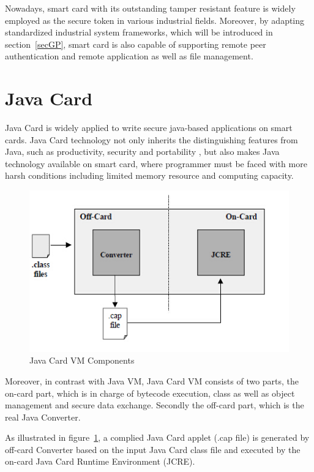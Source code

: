 Nowadays, smart card with its outstanding tamper resistant feature is widely employed as the secure token in various industrial fields. Moreover, by adapting standardized industrial system frameworks, which will be introduced in section~\ref{secGP}, smart card is also capable of supporting remote peer authentication and remote application as well as file management.

\section{Java Card} \label{secJAVACARD}
Java Card is widely applied to write secure java-based applications on smart cards. Java Card technology not only inherits the distinguishing features from Java, such as productivity, security and portability \cite{jcadg}, but also makes Java technology available on smart card, where programmer must be faced with more harsh conditions including limited memory resource and computing capacity.

 \begin{figure}[!htb]
	\centering
	\includegraphics[width=1\textwidth]{jcvm.jpg}
		\caption{Java Card VM Components\cite{jcadg}}
	\label{fig:jcvm}
\end{figure}

Moreover, in contrast with Java VM, Java Card VM consists of two parts, the on-card part, which is in charge of bytecode execution, class as well as object management and secure data exchange. Secondly the off-card part, which is the real Java Converter.

As illustrated in figure~\ref{fig:jcvm}, a complied Java Card applet (.cap file) is generated by off-card Converter based on the input Java Card class file and executed by the on-card Java Card Runtime Environment (JCRE). 






